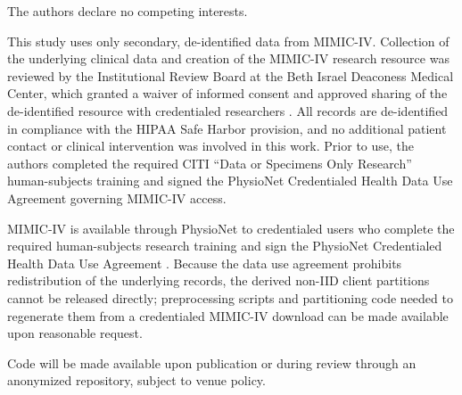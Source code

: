 \documentclass[pdflatex,sn-mathphys-num]{sn-jnl}
\begin{document}
 The authors declare no competing interests.

 This study uses only secondary, de-identified data from MIMIC-IV. Collection of the underlying clinical data and creation of the MIMIC-IV research resource was reviewed by the Institutional Review Board at the Beth Israel Deaconess Medical Center, which granted a waiver of informed consent and approved sharing of the de-identified resource with credentialed researchers \cite{johnson2023mimic}. All records are de-identified in compliance with the HIPAA Safe Harbor provision, and no additional patient contact or clinical intervention was involved in this work. Prior to use, the authors completed the required CITI ``Data or Specimens Only Research'' human-subjects training and signed the PhysioNet Credentialed Health Data Use Agreement governing MIMIC-IV access.

 MIMIC-IV is available through PhysioNet to credentialed users who complete the required human-subjects research training and sign the PhysioNet Credentialed Health Data Use Agreement \cite{johnson2023mimic}. Because the data use agreement prohibits redistribution of the underlying records, the derived non-IID client partitions cannot be released directly; preprocessing scripts and partitioning code needed to regenerate them from a credentialed MIMIC-IV download can be made available upon reasonable request.

 Code will be made available upon publication or during review through an anonymized repository, subject to venue policy.

\end{document}
